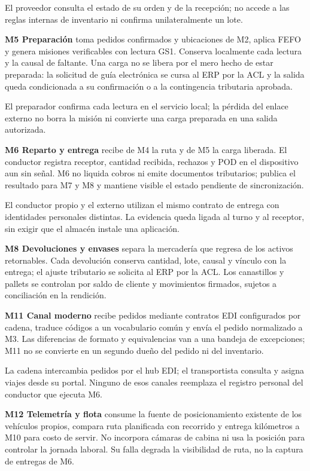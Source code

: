 El proveedor consulta el estado de su orden y de la recepción; no accede a las reglas internas de inventario ni confirma unilateralmente un lote.

\textbf{M5 Preparación} toma pedidos confirmados y ubicaciones de M2, aplica FEFO y genera misiones verificables con lectura GS1. Conserva localmente cada lectura y la causal de faltante. Una carga no se libera por el mero hecho de estar preparada: la solicitud de guía electrónica se cursa al ERP por la ACL y la salida queda condicionada a su confirmación o a la contingencia tributaria aprobada.

El preparador confirma cada lectura en el servicio local; la pérdida del enlace externo no borra la misión ni convierte una carga preparada en una salida autorizada.

\textbf{M6 Reparto y entrega} recibe de M4 la ruta y de M5 la carga liberada. El conductor registra receptor, cantidad recibida, rechazos y POD en el dispositivo aun sin señal. M6 no liquida cobros ni emite documentos tributarios; publica el resultado para M7 y M8 y mantiene visible el estado pendiente de sincronización.

El conductor propio y el externo utilizan el mismo contrato de entrega con identidades personales distintas. La evidencia queda ligada al turno y al receptor, sin exigir que el almacén instale una aplicación.

\textbf{M8 Devoluciones y envases} separa la mercadería que regresa de los activos retornables. Cada devolución conserva cantidad, lote, causal y vínculo con la entrega; el ajuste tributario se solicita al ERP por la ACL. Los canastillos y pallets se controlan por saldo de cliente y movimientos firmados, sujetos a conciliación en la rendición.

\textbf{M11 Canal moderno} recibe pedidos mediante contratos EDI configurados por cadena, traduce códigos a un vocabulario común y envía el pedido normalizado a M3. Las diferencias de formato y equivalencias van a una bandeja de excepciones; M11 no se convierte en un segundo dueño del pedido ni del inventario.

La cadena intercambia pedidos por el hub EDI; el transportista consulta y asigna viajes desde su portal. Ninguno de esos canales reemplaza el registro personal del conductor que ejecuta M6.

\textbf{M12 Telemetría y flota} consume la fuente de posicionamiento existente de los vehículos propios, compara ruta planificada con recorrido y entrega kilómetros a M10 para costo de servir. No incorpora cámaras de cabina ni usa la posición para controlar la jornada laboral. Su falla degrada la visibilidad de ruta, no la captura de entregas de M6.

